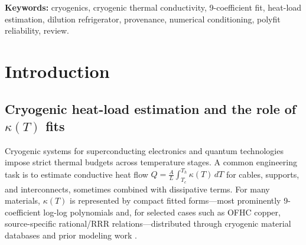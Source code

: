 \documentclass[11pt,a4paper]{article}
\begin{document}
\begin{abstract}
Using  (generated 2026-11-19T10:48:13, \texttt{errors: 0}) and associated artifacts, we review 54 database entries (48 \texttt{log\_polynomial}, 5 \texttt{rational\_copper}, 1 \texttt{runtime\_polyfit}) and 53 fixed-coefficient materials for numeric coefficient--material relations; \texttt{NbTi (Cri/oFlex 3)} is \texttt{runtime\_polyfit} with \texttt{coeffs=null} and excluded from fixed-coefficient numeric relations. Existing validation evidence (synthetic log-log cubic-spline generator, 8th-order \texttt{np.polyfit}, $T\in[2,300]$~K, $N=50$ log-spaced points, perturbation study) shows that in-range integrated conductivity ($\int_{2}^{300}\kappa\,dT$) is comparatively stable under tested perturbations, whereas deep-low-temperature extrapolation (e.g., $\kappa$ at 20~mK) is highly sensitive to perturbations and fitting/process choices and should be treated only as an order-of-magnitude indicator. Evidence also shows strong ill-conditioning of the raw power basis, material-specific structural residual near NbTi $T_c$ under a global 8th-order fit, and a large discrepancy between stored and validation-fit Kapton coefficients (max $|\Delta c|\approx 79.48$). No coefficients are re-fit or invented and no new material-property measurements are claimed.
\end{abstract}

\noindent\textbf{Keywords:} cryogenics, cryogenic thermal conductivity, 9-coefficient fit, heat-load estimation, dilution refrigerator, provenance, numerical conditioning, polyfit reliability, review.

\section{Introduction}
\subsection{Cryogenic heat-load estimation and the role of $\kappa(T)$ fits}
Cryogenic systems for superconducting electronics and quantum technologies impose strict thermal budgets across temperature stages. A common engineering task is to estimate conductive heat flow $Q=\frac{A}{L}\int_{T_c}^{T_h}\kappa(T)\,dT$ for cables, supports, and interconnects, sometimes combined with dissipative terms. For many materials, $\kappa(T)$ is represented by compact fitted forms---most prominently 9-coefficient log-log polynomials and, for selected cases such as OFHC copper, source-specific rational/RRR relations---distributed through cryogenic material databases and prior modeling work \cite{nist,marquardt,bradley,simon1992,flynn,raicu2025}.
\end{document}
